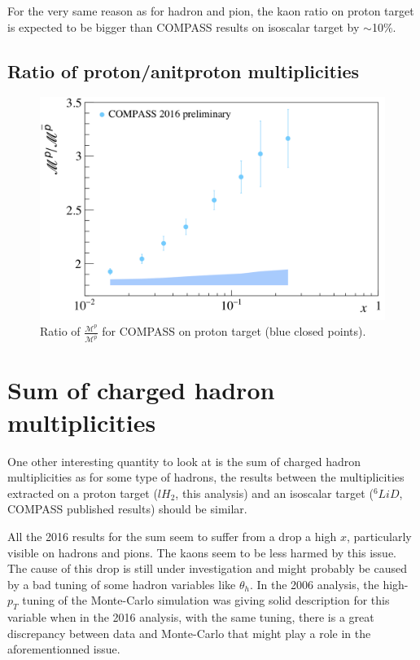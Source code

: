 For the very same reason as for hadron and pion, the kaon ratio on proton target is expected to be bigger than COMPASS results on isoscalar target by $\sim$10\%.

\newpage

\subsection{Ratio of proton/anitproton multiplicities}

\begin{figure}[!h]
  \centering
	\includegraphics[scale=0.5]{./gfx/pr.png}
	\caption{Ratio of $\frac{\mathscr{M}^{p}}{\mathscr{M}^{\overline{p}}}$ for COMPASS on proton target (blue closed points).}
	\label{pic:pratio}
\end{figure}

\section{Sum of charged hadron multiplicities}

One other interesting quantity to look at is the sum of charged hadron multiplicities as for some type of hadrons, the results between the multiplicities extracted on a proton target ($lH_2$, this analysis) and an isoscalar target ($^6LiD$, COMPASS published results) should be similar.

All the 2016 results for the sum seem to suffer from a drop a high $x$, particularly visible on hadrons and pions. The kaons seem to be less harmed by this issue. The cause of this drop is still under investigation and might probably be caused by a bad tuning of some hadron variables like $\theta_h$. In the 2006 analysis, the high-$p_T$ tuning of the Monte-Carlo simulation was giving solid description for this variable when in the 2016 analysis, with the same tuning, there is a great discrepancy between data and Monte-Carlo that might play a role in the aforementionned issue.

